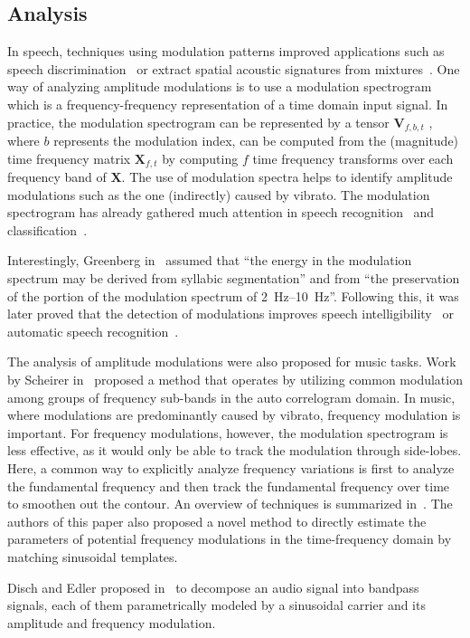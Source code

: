 \subsection{Analysis}\label{sub:modulation-analysis}
In speech, techniques using modulation patterns improved applications such as speech  discrimination~\cite{mesgarani04} or extract spatial acoustic signatures from mixtures~\cite{sukittanon06}.
One way of analyzing amplitude modulations is to use a modulation spectrogram~\cite{greenberg97} which is a frequency-frequency representation of a time domain input signal.
In practice, the modulation spectrogram can be represented by a tensor \(\mathbf{V}_{f, b, t}\) , where \(b\) represents the modulation index, can be computed from the (magnitude) time frequency matrix \(\mathbf{X}_{f, t}\) by computing \(f\) time frequency transforms over each frequency band of \(\mathbf{X}\).
The use of modulation spectra helps to identify amplitude modulations such as the one (indirectly) caused by vibrato. 
The modulation spectrogram has already gathered much attention in speech recognition~\cite{greenberg97, kingsbury98} and classification~\cite{kinnunen08, markaki09}.
\par
Interestingly, Greenberg in~\cite{greenberg97} assumed that ``the energy in the modulation spectrum may be derived from syllabic segmentation'' and from ``the preservation of the portion of the modulation spectrum of \SIrange{2}{10}{\hertz}''.
Following this, it was later proved that the detection of modulations improves speech intelligibility~\cite{elhilali03} or automatic speech recognition~\cite{kingsbury98}.
\par
The analysis of amplitude modulations were also proposed for music tasks. 
Work by Scheirer in~\cite{scheirer99} proposed a method that operates by utilizing common modulation among groups of frequency sub-bands in the auto correlogram domain.
In music, where modulations are predominantly caused by vibrato, frequency modulation is important.
For frequency modulations, however, the modulation spectrogram is less effective, as it would only be able to track the modulation through side-lobes.
Here, a common way to explicitly analyze frequency variations is first to analyze the fundamental frequency and then track the fundamental frequency over time to smoothen out the contour.
An overview of techniques is summarized in~\cite{driedger16}.
The authors of this paper also proposed a novel method to directly estimate the parameters of potential frequency modulations in the time-frequency domain by matching sinusoidal templates.
\par
Disch and Edler proposed in~\cite{disch09} to decompose an audio signal into bandpass signals, each of them parametrically modeled by a sinusoidal carrier and its amplitude and frequency modulation.

